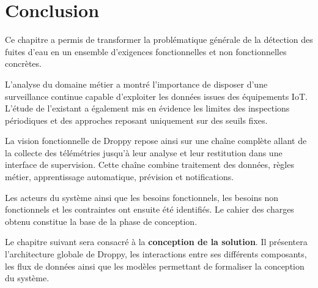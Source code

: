 \section{Conclusion}

Ce chapitre a permis de transformer la problématique générale de la
détection des fuites d'eau en un ensemble d'exigences fonctionnelles et
non fonctionnelles concrètes.

L'analyse du domaine métier a montré l'importance de disposer d'une
surveillance continue capable d'exploiter les données issues des
équipements IoT. L'étude de l'existant a également mis en évidence les
limites des inspections périodiques et des approches reposant uniquement
sur des seuils fixes.

La vision fonctionnelle de Droppy repose ainsi sur une chaîne complète
allant de la collecte des télémétries jusqu'à leur analyse et leur
restitution dans une interface de supervision. Cette chaîne combine
traitement des données, règles métier, apprentissage automatique,
prévision et notifications.

Les acteurs du système ainsi que les besoins fonctionnels, les besoins non
fonctionnels et les contraintes ont ensuite été identifiés. Le cahier des
charges obtenu constitue la base de la phase de conception.

Le chapitre suivant sera consacré à la \textbf{conception de la solution}.
Il présentera l'architecture globale de Droppy, les interactions entre ses
différents composants, les flux de données ainsi que les modèles permettant
de formaliser la conception du système.
